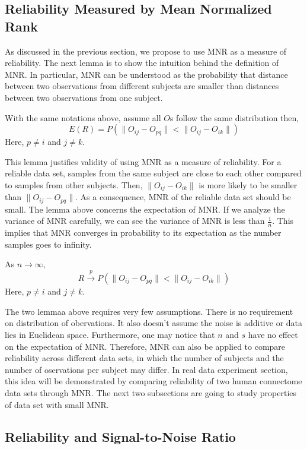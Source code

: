 \documentclass{article}
\begin{document}
\subsection{Reliability Measured by Mean Normalized Rank}

As discussed in the previous section, we propose to use MNR as a measure of reliability. The next lemma is to show the intuition behind the definition of MNR. In particular, MNR can be understood as the probability that distance between two observations from different subjects are smaller than distances between two observations from one subject.
\begin{lem} 
With the same notations above, assume all $O$s follow the same distribution then,
\[ E(R) = P(\|O_{ij}-O_{pq}\| < \|O_{ij}-O_{ik}\|)\]
Here, $p\neq i$ and $j\neq k$.
\end{lem} 
\noindent This lemma justifies validity of using MNR as a measure of reliability. For a reliable data set, samples from the same subject are close to each other compared to samples from other subjects. Then, $\|O_{ij}-O_{ik}\|$ is more likely to be smaller than $\|O_{ij}-O_{pq}\|$. As a consequence, MNR of the reliable data set should be small. The lemma above concerns the expectation of MNR. If we analyze the variance of MNR carefully, we can see the variance of MNR is less than $\frac{1}{n}$. This implies that MNR converges in probability to its expectation as the number samples goes to infinity. 
\begin{lem} 
As $n \rightarrow \infty$,
\[R \xrightarrow[]{p} P(\|O_{ij}-O_{pq}\| < \|O_{ij}-O_{ik}\|)\]
Here, $p\neq i$ and $j\neq k$.
\end{lem} 
\noindent The two lemmaa above requires very few assumptions. There is no requirement on distribution of obervations. It also doesn't assume the noise is additive or data lies in Euclidean space. Furthermore, one may notice that $n$ and $s$ have no effect on the expectation of MNR. Therefore, MNR can also be applied to compare reliability across different data sets, in which the number of subjects and the number of oservations per subject may differ. In real data experiment section, this idea will be demonstrated by comparing reliability of two human connectome data sets through MNR. The next two subsections are going to study properties of data set with small MNR.

\subsection{Reliability and Signal-to-Noise Ratio}
\end{document}
